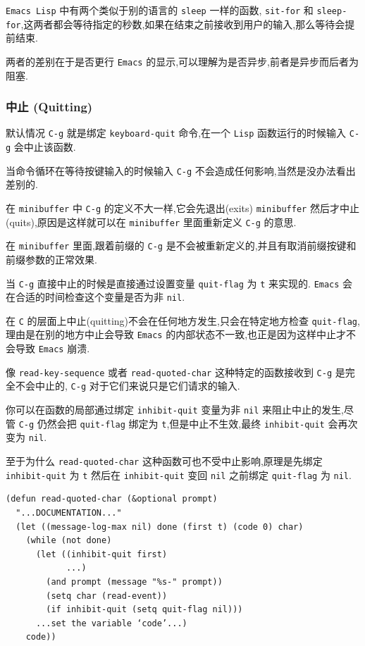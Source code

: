 \documentclass[11pt]{article}
\begin{document}
\texttt{Emacs Lisp} 中有两个类似于别的语言的 \texttt{sleep} 一样的函数, \texttt{sit-for} 和 \texttt{sleep-for},这两者都会等待指定的秒数,如果在结束之前接收到用户的输入,那么等待会提前结束.

两者的差别在于是否更行 \texttt{Emacs} 的显示,可以理解为是否异步,前者是异步而后者为阻塞.


\subsubsection{中止 (Quitting)}
\label{sec:orgfeaf194}

默认情况 \texttt{C-g} 就是绑定 \texttt{keyboard-quit} 命令,在一个 \texttt{Lisp} 函数运行的时候输入 \texttt{C-g} 会中止该函数.

当命令循环在等待按键输入的时候输入 \texttt{C-g} 不会造成任何影响,当然是没办法看出差别的.

在 \texttt{minibuffer} 中 \texttt{C-g} 的定义不大一样,它会先退出(exits) \texttt{minibuffer} 然后才中止(quits),原因是这样就可以在 \texttt{minibuffer} 里面重新定义 \texttt{C-g} 的意思.

在 \texttt{minibuffer} 里面,跟着前缀的 \texttt{C-g} 是不会被重新定义的,并且有取消前缀按键和前缀参数的正常效果.

当 \texttt{C-g} 直接中止的时候是直接通过设置变量 \texttt{quit-flag} 为 \texttt{t} 来实现的. \texttt{Emacs} 会在合适的时间检查这个变量是否为非 \texttt{nil}.

在 \texttt{C} 的层面上中止(quitting)不会在任何地方发生,只会在特定地方检查 \texttt{quit-flag},理由是在别的地方中止会导致 \texttt{Emacs} 的内部状态不一致,也正是因为这样中止才不会导致 \texttt{Emacs} 崩溃.

像 \texttt{read-key-sequence} 或者 \texttt{read-quoted-char} 这种特定的函数接收到 \texttt{C-g} 是完全不会中止的, \texttt{C-g} 对于它们来说只是它们请求的输入.

你可以在函数的局部通过绑定 \texttt{inhibit-quit} 变量为非 \texttt{nil} 来阻止中止的发生,尽管 \texttt{C-g} 仍然会把 \texttt{quit-flag} 绑定为 \texttt{t},但是中止不生效,最终 \texttt{inhibit-quit} 会再次变为 \texttt{nil}.

至于为什么 \texttt{read-quoted-char} 这种函数可也不受中止影响,原理是先绑定 \texttt{inhibit-quit} 为 \texttt{t} 然后在 \texttt{inhibit-quit} 变回 \texttt{nil} 之前绑定 \texttt{quit-flag} 为 \texttt{nil}.

\begin{verbatim}
(defun read-quoted-char (&optional prompt)
  "...DOCUMENTATION..."
  (let ((message-log-max nil) done (first t) (code 0) char)
    (while (not done)
      (let ((inhibit-quit first)
            ...)
        (and prompt (message "%s-" prompt))
        (setq char (read-event))
        (if inhibit-quit (setq quit-flag nil)))
      ...set the variable ‘code’...)
    code))
\end{verbatim}
\end{document}
